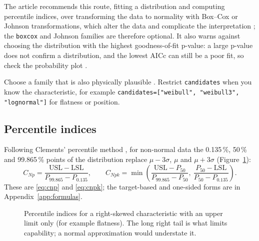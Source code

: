 \documentclass[a4paper,11pt,oneside,openany,parskip=half-,headings=standardclasses,toc=flat,numbers=noenddot]{scrbook}
\newcommand{\code}[1]{\texttt{\begingroup\def\_{\textunderscore\allowbreak}#1\endgroup}}
\newcommand{\figref}[1]{Figure~\ref{#1}}
\begin{document}
The article recommends this route, fitting a distribution and computing percentile indices, over transforming
the data to normality with Box--Cox or Johnson transformations, which alter the data and complicate the
interpretation \cite[Sec.~4]{jy-workflow}; the \code{boxcox} and Johnson families are therefore optional. It also
warns against choosing the distribution with the highest goodness-of-fit p-value: a large p-value does not confirm a
distribution, and the lowest AICc can still be a poor fit, so check the probability plot \cite[Sec.~2.2]{jy-workflow}.

\begin{keypoint}[Tip]
Choose a family that is also physically plausible \cite[Sec.~4]{jy-workflow}. Restrict \code{candidates} when you know the
characteristic, for example \code{candidates=["weibull", "weibull3", "lognormal"]} for flatness or position.
\end{keypoint}

\subsection{Percentile indices}
Following Clements' percentile method \cite{clements}, for non-normal data the 0.135\,\%, 50\,\% and
99.865\,\% points of the distribution replace
$\mu-3\sigma$, $\mu$ and $\mu+3\sigma$ (\figref{fig:percentile}):
\[
C_{Np} = \frac{\mathrm{USL}-\mathrm{LSL}}{P_{99.865}-P_{0.135}}, \qquad
C_{Npk} = \min\left(\frac{\mathrm{USL}-P_{50}}{P_{99.865}-P_{50}},\
                   \frac{P_{50}-\mathrm{LSL}}{P_{50}-P_{0.135}}\right).
\]
These are \eqref{eq:cnp} and \eqref{eq:cnpk}; the target-based and one-sided forms are in
Appendix~\ref{app:formulas}.

\begin{figure}[!htp]
\centering
{}
\caption{Percentile indices for a right-skewed characteristic with an upper limit only (for example
flatness). The long right tail is what limits capability; a normal approximation would understate it.}\label{fig:percentile}
\end{figure}
\end{document}
